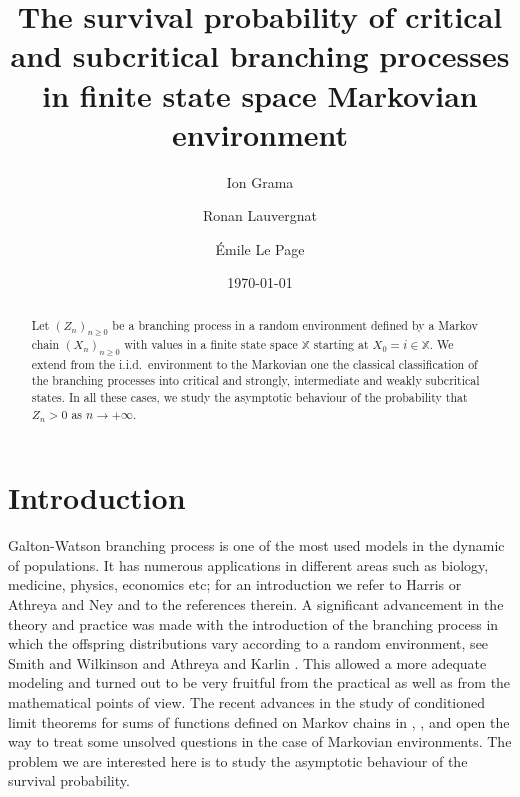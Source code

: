 \documentclass[12pt]{amsart}
\theoremstyle{definition}
\numberwithin{equation}{section}
\def\bb#1{\mathbb{#1}}
\def\geq{\geqslant}
\begin{document}
\title[Branching processes in Markovian environment]{The survival probability of critical and subcritical branching processes in finite state space Markovian environment}

\author{Ion Grama}

\author{Ronan Lauvergnat}

\author{\'Emile Le Page}

\date{\today}


\begin{abstract}
Let $(Z_n)_{n\geq 0}$ be a branching process in a random environment 
defined by a Markov chain $(X_n)_{n\geq 0}$ 
with values in a finite state space $\bb X$
starting at $X_0=i \in\mathbb X.$
We extend from the i.i.d.\ environment to the Markovian one the classical classification of the branching processes into critical and strongly, intermediate and weakly subcritical states.
In all these cases, we study the asymptotic behaviour of the probability that $Z_n>0$ as $n\to+\infty$.
\end{abstract}

\maketitle

\section{Introduction}
Galton-Watson branching process is one of the most used models in the dynamic of populations. 
It has numerous applications in different areas such as biology, medicine, physics, economics etc; 
for an introduction we refer to 
Harris \cite{harris2002theory} or
Athreya and Ney \cite{athreya_branching_1972} and to the references therein.
A significant advancement in the theory and practice was made with the introduction of the branching process in which the offspring distributions vary according to a random environment,
see Smith and Wilkinson \cite{smith_branching_1969} and
Athreya and Karlin \cite{athreya1971branching1, athreya1971branching2}.
This allowed a more adequate modeling and turned out to be very fruitful from the practical as well as from the mathematical 
points of view. 
The recent advances in the study of conditioned limit theorems for sums of functions defined on Markov chains in \cite{grama_conditioned_2016}, \cite{GLLP_affine_2016}, \cite{grama_limit_2016-1} and \cite{GLLP_CLLT_2017}
open the way  to treat some unsolved questions in the case of Markovian environments.  
The problem we are interested here is to study the asymptotic behaviour of the survival probability.
\end{document}

